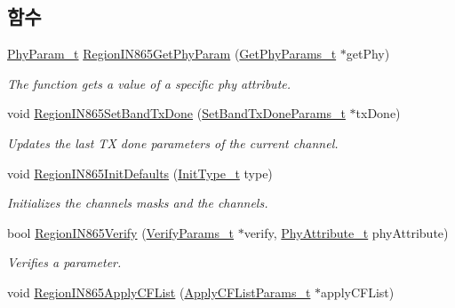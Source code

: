 \subsection*{함수}
\begin{DoxyCompactItemize}
\item 
\mbox{\hyperlink{group___r_e_g_i_o_n_gaed159b26e5c4677236b6e8677019db30}{Phy\+Param\+\_\+t}} \mbox{\hyperlink{group___r_e_g_i_o_n_i_n865_ga209a89a7195dbbee8428bbcd0133d986}{Region\+I\+N865\+Get\+Phy\+Param}} (\mbox{\hyperlink{group___r_e_g_i_o_n_gab471483fff904f4f89bbc03f7fc380ab}{Get\+Phy\+Params\+\_\+t}} $\ast$get\+Phy)
\begin{DoxyCompactList}\small\item\em The function gets a value of a specific phy attribute. \end{DoxyCompactList}\item 
void \mbox{\hyperlink{group___r_e_g_i_o_n_i_n865_ga328c341535bded76103e52c4e4c685fe}{Region\+I\+N865\+Set\+Band\+Tx\+Done}} (\mbox{\hyperlink{group___r_e_g_i_o_n_gad0524aa0673c0814a71e7a4f9cade3fc}{Set\+Band\+Tx\+Done\+Params\+\_\+t}} $\ast$tx\+Done)
\begin{DoxyCompactList}\small\item\em Updates the last TX done parameters of the current channel. \end{DoxyCompactList}\item 
void \mbox{\hyperlink{group___r_e_g_i_o_n_i_n865_ga06d37a72380911c81768c31a4f0b6da7}{Region\+I\+N865\+Init\+Defaults}} (\mbox{\hyperlink{group___r_e_g_i_o_n_gaddc73ae10673ec925724e7870363bda9}{Init\+Type\+\_\+t}} type)
\begin{DoxyCompactList}\small\item\em Initializes the channels masks and the channels. \end{DoxyCompactList}\item 
bool \mbox{\hyperlink{group___r_e_g_i_o_n_i_n865_ga1cc642ea1ceb59071532c10f0307981d}{Region\+I\+N865\+Verify}} (\mbox{\hyperlink{group___r_e_g_i_o_n_ga966d97bc2f25df1c09e92e60ef652276}{Verify\+Params\+\_\+t}} $\ast$verify, \mbox{\hyperlink{group___r_e_g_i_o_n_ga9445b07fdf77581ecfaf389970e635f8}{Phy\+Attribute\+\_\+t}} phy\+Attribute)
\begin{DoxyCompactList}\small\item\em Verifies a parameter. \end{DoxyCompactList}\item 
void \mbox{\hyperlink{group___r_e_g_i_o_n_i_n865_ga4b896d2b7f6cd70d1c11b9f38ee06acf}{Region\+I\+N865\+Apply\+C\+F\+List}} (\mbox{\hyperlink{group___r_e_g_i_o_n_ga71588e9ad07e34b78fa91d51881fd3c6}{Apply\+C\+F\+List\+Params\+\_\+t}} $\ast$apply\+C\+F\+List)

\end{DoxyCompactItemize}
